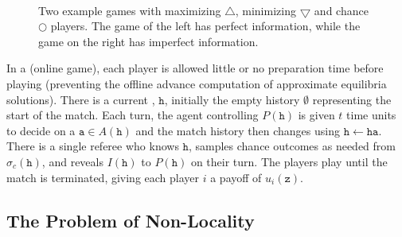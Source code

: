 \documentclass[letterpaper]{article}
\newcommand{\tta}{\mathtt{a}}
\newcommand{\tth}{\mathtt{h}}
\newcommand{\ttz}{\mathtt{z}}
\newcommand{\defword}[1]{\textbf{\boldmath{#1}}}
\begin{document}
\begin{figure}
\begin{center}
~~~
\end{center}
\caption{Two example games with maximizing $\bigtriangleup$, minimizing $\bigtriangledown$ and chance $\bigcirc$ players. The game of the left has perfect information, while the game on the right has imperfect information. \label{fig:coordGame}}
\end{figure}

In a \defword{match} (online game), each player is allowed little or no preparation time before playing (preventing the offline advance computation of approximate equilibria solutions).
There is a current \defword{match history}, $\tth$, initially the empty history $\emptyset$ representing the start of the match. Each turn, 
the agent controlling $P(\tth)$ is given $t$ time units to decide on a \defword{match action} $\tta \in A(\tth)$ and the 
match history then changes using $\tth \leftarrow \tth \tta$. There is a single referee who knows $\tth$, samples chance outcomes 
as needed from $\sigma_c(\tth)$, and reveals $I(\tth)$ to $P(\tth)$ on their turn. The players play until the match is terminated, 
giving each player $i$ a payoff of $u_i(\ttz)$.

\subsection{The Problem of Non-Locality}
\end{document}
